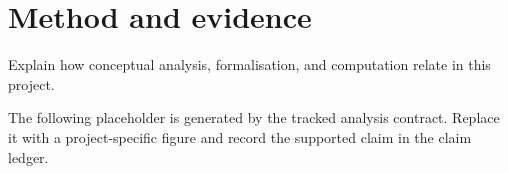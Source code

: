 \section{Method and evidence}
Explain how conceptual analysis, formalisation, and computation relate in this project.

The following placeholder is generated by the tracked analysis contract. Replace it
with a project-specific figure and record the supported claim in the claim ledger.


